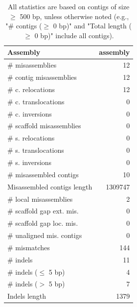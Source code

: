 \documentclass[12pt,a4paper]{article}
\begin{document}
\begin{table}[ht]
\begin{center}
\caption{All statistics are based on contigs of size $\geq$ 500 bp, unless otherwise noted (e.g., "\# contigs ($\geq$ 0 bp)" and "Total length ($\geq$ 0 bp)" include all contigs).}
\begin{tabular}{|l*{1}{|r}|}
\hline
Assembly & assembly \\ \hline
\# misassemblies & 12 \\ \hline
\hspace{2mm}\# contig misassemblies & 12 \\ \hline
\hspace{5mm}\# c. relocations & 12 \\ \hline
\hspace{5mm}\# c. translocations & 0 \\ \hline
\hspace{5mm}\# c. inversions & 0 \\ \hline
\hspace{2mm}\# scaffold misassemblies & 0 \\ \hline
\hspace{5mm}\# s. relocations & 0 \\ \hline
\hspace{5mm}\# s. translocations & 0 \\ \hline
\hspace{5mm}\# s. inversions & 0 \\ \hline
\# misassembled contigs & 10 \\ \hline
Misassembled contigs length & 1309747 \\ \hline
\# local misassemblies & 2 \\ \hline
\# scaffold gap ext. mis. & 0 \\ \hline
\# scaffold gap loc. mis. & 0 \\ \hline
\# unaligned mis. contigs & 0 \\ \hline
\# mismatches & 144 \\ \hline
\# indels & 11 \\ \hline
\hspace{5mm}\# indels ($\leq$ 5 bp) & 4 \\ \hline
\hspace{5mm}\# indels ($>$ 5 bp) & 7 \\ \hline
Indels length & 1379 \\ \hline
\end{tabular}
\end{center}
\end{table}
\end{document}
